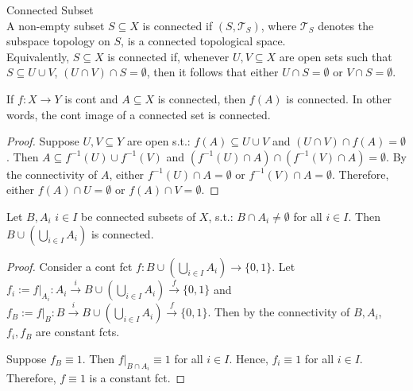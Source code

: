 \begin{definition}{Connected Subset}\\
A non-empty subset $S \subseteq X$ is connected if $(S, \mathcal{T}_S)$, where $\mathcal{T} _S$ denotes the subspace topology on $S$, is a connected topological space.\\
Equivalently, $S \subseteq X$ is connected if, whenever $U,V \subseteq X$ are open sets such that $S \subseteq U\cup V$, $(U \cap V) \cap S = \emptyset$, then it follows that either $U \cap S=\emptyset$ or $V \cap S=\emptyset$.
\end{definition}

\begin{proposition}
    If $f:X \rightarrow Y$ is cont and $A \subseteq X$ is connected, then $f(A)$ is connected. In other words, the cont image of a connected set is connected.
\end{proposition}

\begin{proof}
    Suppose $U,V \subseteq Y$ are open s.t.: $f(A) \subseteq U\cup V$ and $(U \cap V) \cap f(A) = \emptyset$. Then $A \subseteq f^{-1}(U) \cup f^{-1}(V)$ and $(f^{-1}(U) \cap A) \cap (f^{-1}(V) \cap A) = \emptyset$. By the connectivity of $A$, either $f^{-1}(U) \cap A = \emptyset$ or $f^{-1}(V) \cap A = \emptyset$. Therefore, either $f(A) \cap U = \emptyset$ or $f(A) \cap V = \emptyset$.
\end{proof}

\begin{proposition}
    Let $B, A_i$ $i\in I$ be connected subsets of $X$, s.t.: $B \cap A_i \neq \emptyset$ for all $i\in I$. Then $B \cup (\bigcup_{i\in I}A_i)$ is connected.
\end{proposition}

\begin{proof}
    Consider a cont fct $f : B \cup (\bigcup_{i\in I}A_i) \rightarrow \{0,1\}$. Let $f_i := \left. f \right| _{A_i} : A_i \overset{i}{\rightarrow} B \cup (\bigcup_{i\in I}A_i) \overset{f}{\rightarrow} \{0,1\}$ and $f_B := \left. f \right| _{B} : B \overset{i}{\rightarrow} B \cup (\bigcup_{i\in I}A_i) \overset{f}{\rightarrow} \{0,1\}$. Then by the connectivity of $B, A_i$, $f_i, f_B$ are constant fcts.
    
    Suppose $f_B \equiv 1$. Then $\left. f \right|_{B \cap A_i} \equiv 1$ for all $i \in I$. Hence, $f_i \equiv 1$ for all $i\in I$. Therefore, $f \equiv 1$ is a constant fct.
\end{proof}

